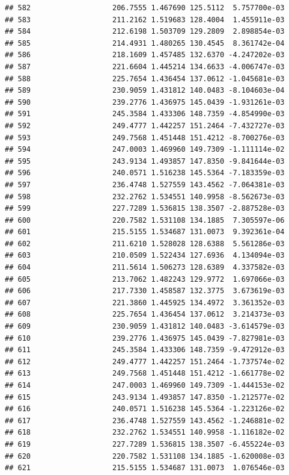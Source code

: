 \documentclass[
]{article}
\begin{document}
\begin{verbatim}
## 582                   206.7555 1.467690 125.5112  5.757700e-03
## 583                   211.2162 1.519683 128.4004  1.455911e-03
## 584                   212.6198 1.503709 129.2809  2.898854e-03
## 585                   214.4931 1.480265 130.4545  8.361742e-04
## 586                   218.1609 1.457485 132.6370 -4.247202e-03
## 587                   221.6604 1.445214 134.6633 -4.006747e-03
## 588                   225.7654 1.436454 137.0612 -1.045681e-03
## 589                   230.9059 1.431812 140.0483 -8.104603e-04
## 590                   239.2776 1.436975 145.0439 -1.931261e-03
## 591                   245.3584 1.433306 148.7359 -4.854990e-03
## 592                   249.4777 1.442257 151.2464 -7.432727e-03
## 593                   249.7568 1.451448 151.4212 -8.700276e-03
## 594                   247.0003 1.469960 149.7309 -1.111114e-02
## 595                   243.9134 1.493857 147.8350 -9.841644e-03
## 596                   240.0571 1.516238 145.5364 -7.183359e-03
## 597                   236.4748 1.527559 143.4562 -7.064381e-03
## 598                   232.2762 1.534551 140.9958 -8.562673e-03
## 599                   227.7289 1.536815 138.3507 -2.887528e-03
## 600                   220.7582 1.531108 134.1885  7.305597e-06
## 601                   215.5155 1.534687 131.0073  9.392361e-04
## 602                   211.6210 1.528028 128.6388  5.561286e-03
## 603                   210.0509 1.522434 127.6936  4.134094e-03
## 604                   211.5614 1.506273 128.6389  4.337582e-03
## 605                   213.7062 1.482243 129.9772  1.697066e-03
## 606                   217.7330 1.458587 132.3775  3.673619e-03
## 607                   221.3860 1.445925 134.4972  3.361352e-03
## 608                   225.7654 1.436454 137.0612  3.214373e-03
## 609                   230.9059 1.431812 140.0483 -3.614579e-03
## 610                   239.2776 1.436975 145.0439 -7.827981e-03
## 611                   245.3584 1.433306 148.7359 -9.472912e-03
## 612                   249.4777 1.442257 151.2464 -1.737574e-02
## 613                   249.7568 1.451448 151.4212 -1.661778e-02
## 614                   247.0003 1.469960 149.7309 -1.444153e-02
## 615                   243.9134 1.493857 147.8350 -1.212577e-02
## 616                   240.0571 1.516238 145.5364 -1.223126e-02
## 617                   236.4748 1.527559 143.4562 -1.246881e-02
## 618                   232.2762 1.534551 140.9958 -1.116182e-02
## 619                   227.7289 1.536815 138.3507 -6.455224e-03
## 620                   220.7582 1.531108 134.1885 -1.620008e-03
## 621                   215.5155 1.534687 131.0073  1.076546e-03

\end{verbatim}
\end{document}
